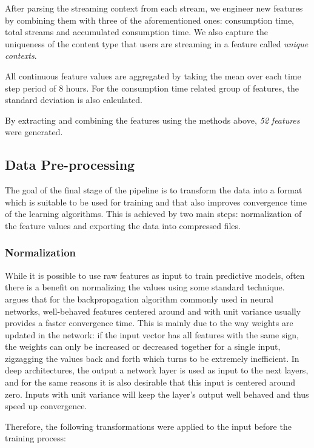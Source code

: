 \documentclass{kththesis}
\begin{document}
After parsing the streaming context from each stream, we engineer new features by combining them with three of the aforementioned ones: consumption time, total streams and accumulated consumption time. We also capture the uniqueness of the content type that users are streaming in a feature called \emph{unique contexts}.

All continuous feature values are aggregated by taking the mean over  each time step period of 8 hours. For the consumption time related group of features, the standard deviation is also calculated.

By extracting and combining the features using the methods above, \emph{52 features} were generated. 

\subsection{Data Pre-processing}

The goal of the final stage of the pipeline is to transform the data into a format which is suitable to be used for training and that also improves convergence time of the learning algorithms. This is achieved by two main steps: normalization of the feature values and exporting the data into compressed files.

\subsubsection{Normalization}

While it is possible to use raw features as input to train predictive models, often there is a benefit on normalizing the values using some standard technique. \citep{lecun2012efficient} argues that for the backpropagation algorithm commonly used in neural networks, well-behaved features centered around and with unit variance usually provides a faster convergence time. This is mainly due to the way weights are updated in the network: if the input vector has all features with the same sign, the weights can only be increased or decreased together for a single input, zigzagging the values back and forth which turns to be extremely inefficient. In deep architectures, the output a network layer is used as input to the next layers, and for the same reasons it is also desirable that this input is centered around zero. Inputs with unit variance will keep the layer's output well behaved and thus speed up convergence.

Therefore, the following transformations were applied to the input before the training process:
\end{document}
